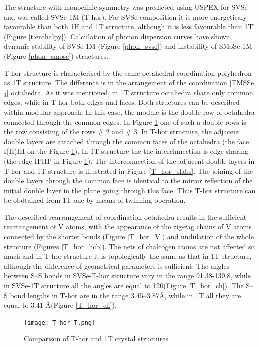 \documentclass[a4paperm]{article}
\begin{document}
The structure with monoclinic symmetry was predicted using USPEX for SVSe and was called SVSe-1M (T-hor). 
For SVSe composition it is more  energeticaly favourable than both 1H and 1T structure, although it is less favourable than 1T' (Figure \ref{t:enthalpy}).
Calculation of phonon dispersion curves have shown dynamic stability of SVSe-1M (Figure \ref{phon_svse}) and instability of SMoSe-1M (Figure \ref{phon_smose}) structures.


T-hor structure is characterised by the same octahedral coordination polyhedron as 1T structure.
The difference is in the arrangement of the coordination [TMSSe$_3$] octahedra.
As it was mentioned, in 1T structure octahedra share only common edges, while in T-hor both edges and faces.
Both structures can be described within modular approach.
In this case, the module is the double row of octahedra connected through the common edges.
In Figure \ref{T_hor_T} one of such a double rows is the row consisting of the rows \# 2 and \# 3.
In T-hor structure, the adjacent double layers are attached through the common faces  of the octahedra (the face I(II)III on the Figure \ref{T_hor_T}).
In 1T structure the the intercinnection is edge-sharing (the edge II'III' in Figure \ref{T_hor_T}). 
The interconnection of the adjacent double layers in T-hor and 1T structure is illustrated in  Figure \ref{T_hor_slabs}.
The joining of the double layers through the common face is identical to the mirror reflection of the initial double layer in the plane going through this face.
Thus T-hor structure can be obdtained from 1T one by means of twinning operation.


The described rearrangement of coordination octahedra results in the sufficient rearrangement of V atoms, with the appearance of the zig-zag chains of V atoms connected by the shorter bonds (Figure \ref{T_hor_V}) and undulation of the whole structure (Figures \ref{T_hor_hcb}).
The nets of chalcogen atoms are not affected so much and in T-hor structure it is topologically the same as that in 1T structure, although the difference of geometrical parameters is sufficient.
The angles between S--S bonds in SVSe-T-hor structure vary in the range 91.38-139.8\textdegree, while in SVSe-1T structure all the angles are equal to 120\textdegree (Figure \ref{T_hor_ch}).
The S--S bond lengths in T-hor are in the range 3.45--3.87\AA, while in 1T all they are equal to 3.41 \AA (Figure \ref{T_hor_ch}).


\begin{figure}[H]
	\texttt{[image: T\_hor\_T.png]} \\
	\caption{Comparison of T-hor and 1T crystal structures}
	\label{T_hor_T}
\end{figure}
\end{document}
